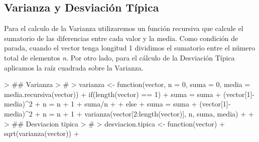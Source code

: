 \documentclass [a4paper] {article}
\begin{document}
\subsection{Varianza y Desviación Típica}

Para el calculo de la Varianza utilizaremos un función recursiva que calcule el sumatorio de las diferencias entre cada valor y la media. Como condición de parada, cuando el vector tenga longitud 1
dividimos el sumatorio entre el número total de elementos \textit{n}. Por otro lado, para el cálculo de la Desviación Típica aplicamos la raíz cuadrada sobre la Varianza.
\begin{Schunk}
\begin{Sinput}
> ## Varianza
> #
> varianza <- function(vector, n = 0, suma = 0, media = media.recursiva(vector)){
+     if(length(vector) == 1){
+         suma = suma + (vector[1]-media)^2
+         n = n + 1
+         suma/n
+     }
+     else{
+         suma = suma + (vector[1]-media)^2
+         n = n + 1
+         varianza(vector[2:length(vector)], n, suma, media)
+     }
+ }
> ## Desviacion tipica
> #
> desviacion.tipica <- function(vector){
+ 	sqrt(varianza(vector))
+ }
\end{Sinput}
\end{Schunk}
\end{document}
